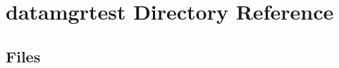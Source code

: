 \section{datamgrtest Directory Reference}
\label{dir_4d8e8a83c5fac4dd7e06d673f23097db}
\subsection*{Files}
\begin{DoxyCompactItemize}
\end{DoxyCompactItemize}
